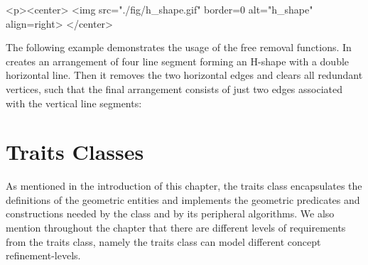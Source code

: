 \lcTex{%
  \setlength{\widthRight}{1.5cm}
  \setlength{\widthLeft}{\widthLineReal}
  \addtolength{\widthLeft}{-\widthRight}
  \begin{minipage}{\widthLeft}
}
\begin{ccHtmlOnly}
  <p><center>
    <img src="./fig/h_shape.gif" border=0 alt="h_shape" align=right>
  </center>
\end{ccHtmlOnly}
The following example demonstrates the usage of the free removal
functions. In creates an arrangement of four line segment forming
an H-shape with a double horizontal line. Then it removes the two
horizontal edges and clears all redundant vertices, such that the
final arrangement consists of just two edges associated with the
vertical line segments:


\section{Traits Classes}
\label{arr_sec:traits}
%
As mentioned in the introduction of this chapter, the traits class
encapsulates the definitions of the geometric entities and
implements the geometric predicates and constructions needed by
the  class and by its peripheral algorithms. We also
mention throughout the chapter that there are different levels of
requirements from the traits class, namely the traits class can model
different concept refinement-levels.

